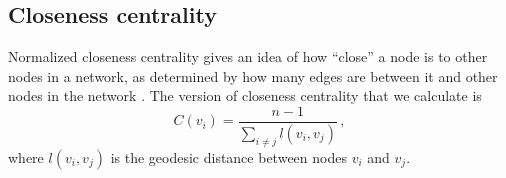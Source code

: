 \documentclass[%
 reprint,
 amsmath,amssymb,
 aps,
]{revtex4-1}
\begin{document}



\subsection{Closeness centrality}\label{close}

Normalized closeness centrality gives an idea of how ``close'' a node is to other nodes in a network, as determined by how many edges are between it and other nodes in the network \cite{newman2018}. The version of closeness centrality that we calculate is
\begin{equation}
    C(v_i) = \frac{n - 1}{\sum\limits_{i \neq j} l(v_i,v_j)}\,,
\end{equation}
where $l(v_i, v_j)$ is the geodesic distance between nodes $v_i$ and $v_j$.
\end{document}
